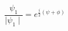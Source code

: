 \begin{equation}
\frac{\psi_1}{\mid \psi_1 \mid} = e^{\frac{i}{2} (\psi+\phi)}  \label{eq:zb}
\end{equation}

